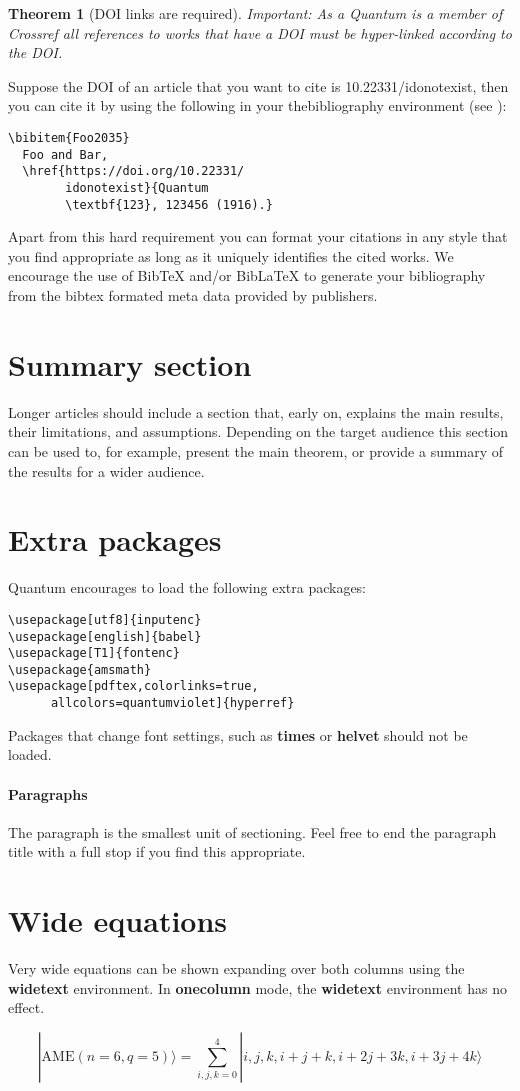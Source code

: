 \documentclass[prx,a4paper,aps,twocolumn,superscriptaddress,11pt]{quantumarticle}
\newtheorem{theorem}{Theorem}
\begin{document}
\begin{theorem}[DOI links are required]
  Important: As a Quantum is a member of Crossref all references to works that have a DOI must be hyper-linked according to the DOI.
\end{theorem}
Suppose the DOI of an article that you want to cite is 10.22331/idonotexist, then you can cite it by using the following in your thebibliography environment (see \cite{Foo2035}):
\begin{verbatim}
\bibitem{Foo2035}
  Foo and Bar, 
  \href{https://doi.org/10.22331/
        idonotexist}{Quantum 
        \textbf{123}, 123456 (1916).}
\end{verbatim}
Apart from this hard requirement you can format your citations in any style that you find appropriate as long as it uniquely identifies the cited works.
We encourage the use of BibTeX and/or BibLaTeX to generate your bibliography from the bibtex formated meta data provided by publishers.

\section{Summary section}
\label{sec:sec1}
Longer articles should include a section that, early on, explains the main results, their limitations, and assumptions.
Depending on the target audience this section can be used to, for example, present the main theorem, or provide a summary of the results for a wider audience.

\section{Extra packages}
Quantum encourages to load the following extra packages: 
\begin{verbatim}
\usepackage[utf8]{inputenc}
\usepackage[english]{babel}
\usepackage[T1]{fontenc}
\usepackage{amsmath}  
\usepackage[pdftex,colorlinks=true,
      allcolors=quantumviolet]{hyperref}
\end{verbatim}
Packages that change font settings, such as \textbf{times} or \textbf{helvet} should not be loaded.

\paragraph{Paragraphs}
The paragraph is the smallest unit of sectioning.
Feel free to end the paragraph title with a full stop if you find this appropriate.

\section{Wide equations}
Very wide equations can be shown expanding over both columns using the \textbf{widetext} environment.
In \textbf{onecolumn} mode, the \textbf{widetext} environment has no effect.
\begin{widetext}
  \begin{equation}
|\mathrm{AME}(n=6,q=5)\rangle=\sum_{i,j,k=0}^4 |i,j,k,i+j+k,i+2j+3k,i+3j+4k\rangle
  \end{equation}
\end{widetext}
\end{document}
